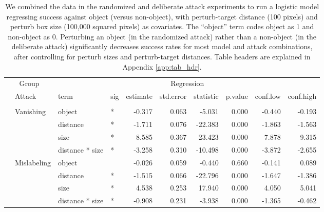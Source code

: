 \begin{longtable}[t]{llllrrrrrr}
\caption{\label{tab:rand_arb_compare_table}We combined the data in the randomized and deliberate attack experiments to run a logistic model regressing success against object (versus non-object), with perturb-target distance (100 pixels) and perturb box size (100,000 squared pixels) as covariates. The ``object'' term codes object as 1 and non-object as 0. Perturbing an object (in the randomized attack) rather than a non-object (in the deliberate attack) significantly decreases success rates for most model and attack combinations, after controlling for perturb sizes and perturb-target distances. Table headers are explained in Appendix \ref{app:tab_hdr}.}\\
\toprule
\multicolumn{2}{c}{Group} & \multicolumn{8}{c}{Regression} \\
\cmidrule(l{3pt}r{3pt}){1-2} \cmidrule(l{3pt}r{3pt}){3-10}
 & Attack & term & sig & estimate & std.error & statistic & p.value & conf.low & conf.high\\
\midrule
\addlinespace[0.3em]
\multicolumn{10}{l}{\textbf{YOLOv3}}\\
\hspace{1em} & Vanishing & object & * & -0.317 & 0.063 & -5.031 & 0.000 & -0.440 & -0.193\\
\cmidrule{3-10}\nopagebreak
\hspace{1em} &  & distance & * & -1.711 & 0.076 & -22.383 & 0.000 & -1.863 & -1.563\\
\cmidrule{3-10}\nopagebreak
\hspace{1em} &  & size & * & 8.585 & 0.367 & 23.423 & 0.000 & 7.878 & 9.315\\
\cmidrule{3-10}\nopagebreak
\hspace{1em} &  & distance * size & * & -3.258 & 0.310 & -10.498 & 0.000 & -3.872 & -2.655\\
\cmidrule{2-10}\nopagebreak
\hspace{1em} & Mislabeling & object &  & -0.026 & 0.059 & -0.440 & 0.660 & -0.141 & 0.089\\
\cmidrule{3-10}\nopagebreak
\hspace{1em} &  & distance & * & -1.515 & 0.066 & -22.796 & 0.000 & -1.647 & -1.386\\
\cmidrule{3-10}\nopagebreak
\hspace{1em} &  & size & * & 4.538 & 0.253 & 17.940 & 0.000 & 4.050 & 5.041\\
\cmidrule{3-10}\nopagebreak
\hspace{1em} &  & distance * size & * & -0.908 & 0.231 & -3.938 & 0.000 & -1.365 & -0.462\\

\end{longtable}
